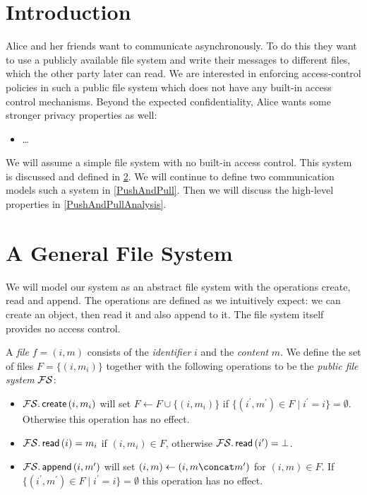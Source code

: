 \acresetall{}
\section{Introduction}\label{Introduction}

Alice and her friends want to communicate asynchronously.
To do this they want to use a publicly available file system and write their 
messages to different files, which the other party later can read.
We are interested in enforcing access-control policies in such a public file 
system which does not have any built-in access control mechanisms.
Beyond the expected confidentiality, Alice wants some stronger privacy 
properties as well:
\begin{itemize}
  \item \dots
\end{itemize}

We will assume a simple file system with no built-in access control.
This system is discussed and defined in \cref{FileSystem}.
We will continue to define two communication models such a system in 
\cref{PushAndPull}.
Then we will discuss the high-level properties in \cref{PushAndPullAnalysis}.



\section{A General File System}\label{FileSystem}

We will model our system as an abstract file system with the operations create, 
read and append.
The operations are defined as we intuitively expect: we can create an object, 
then read it and also append to it.
The file system itself provides no access control.

\begin{definition}\label{FS}
  A \emph{file} \(f = (i, m)\) consists of the \emph{identifier} \(i\) and the 
  \emph{content} \(m\).
  We define the set of files \(F = \{(i, m_i)\}\) together with the following 
  operations to be the \emph{public file system} \(\operatorname{\mathcal{FS}}\):
  \begin{itemize}
    \item \(\operatorname{\operatorname{\mathcal{FS}}.\mathsf{create}}\left( i, m_i \right)\) will set \(F\gets F\cup \{(i, m_i)\}\) if 
      \(\{(i^\prime, m^\prime)\in F \mid i^\prime = i\} = \emptyset\).
      Otherwise this operation has no effect.

    \item \(\operatorname{\operatorname{\mathcal{FS}}.\mathsf{read}}\left( i \right) = m_i\) if \((i, m_i)\in F\), otherwise 
      \(\operatorname{\operatorname{\mathcal{FS}}.\mathsf{read}}\left( i^\prime \right) = \bot\).

    \item \(\operatorname{\operatorname{\mathcal{FS}}.\mathsf{append}}\left( i, m^\prime \right)\) will set \((i, m)\gets (i, m\concat 
        m^\prime)\) for \((i, m)\in F\).
      If \(\{(i^\prime, m^\prime)\in F\mid i^\prime = i\} = \emptyset\) this 
      operation has no effect.
  \end{itemize}
\end{definition}

